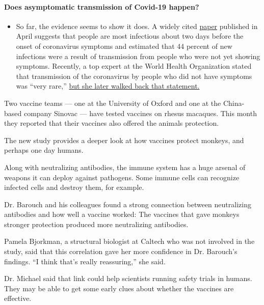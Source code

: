 \begin{itemize}
{  \paragraph{Does asymptomatic transmission of Covid-19
  happen?}\label{does-asymptomatic-transmission-of-covid-19-happen}}

  \begin{itemize}
  \tightlist
  \item
    So far, the evidence seems to show it does. A widely cited
    \href{https://www.nature.com/articles/s41591-020-0869-5}{paper}
    published in April suggests that people are most infectious about
    two days before the onset of coronavirus symptoms and estimated that
    44 percent of new infections were a result of transmission from
    people who were not yet showing symptoms. Recently, a top expert at
    the World Health Organization stated that transmission of the
    coronavirus by people who did not have symptoms was ``very rare,''
    \href{https://www.nytimes.com/2020/06/09/world/coronavirus-updates.html?action=click\&pgtype=Article\&state=default\&region=MAIN_CONTENT_3\&context=storylines_faq\#link-1f302e21}{but
    she later walked back that statement.}
  \end{itemize}
\end{itemize}

Two vaccine teams --- one at the University of Oxford and one at the
China-based company Sinovac --- have tested vaccines on rhesus macaques.
This month they reported that their vaccines also offered the animals
protection.

The new study provides a deeper look at how vaccines protect monkeys,
and perhaps one day humans.

Along with neutralizing antibodies, the immune system has a huge arsenal
of weapons it can deploy against pathogens. Some immune cells can
recognize infected cells and destroy them, for example.

Dr. Barouch and his colleagues found a strong connection between
neutralizing antibodies and how well a vaccine worked: The vaccines that
gave monkeys stronger protection produced more neutralizing antibodies.

Pamela Bjorkman, a structural biologist at Caltech who was not involved
in the study, said that this correlation gave her more confidence in Dr.
Barouch's findings. ``I think that's really reassuring,'' she said.

Dr. Michael said that link could help scientists running safety trials
in humans. They may be able to get some early clues about whether the
vaccines are effective.

